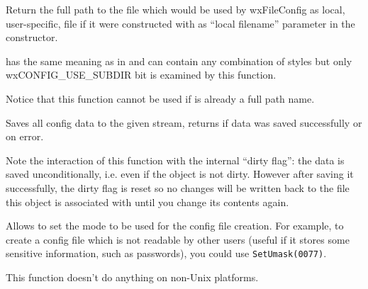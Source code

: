 \label{wxfilenamegetlocalfile}


Return the full path to the file which would be used by wxFileConfig as local,
user-specific, file if it were constructed with  as ``local
filename'' parameter in the constructor.

 has the same meaning as in  
and can contain any combination of styles but only wxCONFIG\_USE\_SUBDIR bit is
examined by this function.

Notice that this function cannot be used if  is already a full
path name.


\label{wxfileconfigsave}


Saves all config data to the given stream, returns \true if data was saved
successfully or \false on error.

Note the interaction of this function with the internal ``dirty flag'': the
data is saved unconditionally, i.e. even if the object is not dirty. However
after saving it successfully, the dirty flag is reset so no changes will be
written back to the file this object is associated with until you change its
contents again.




\label{wxfileconfigsetumask}


Allows to set the mode to be used for the config file creation. For example, to
create a config file which is not readable by other users (useful if it stores
some sensitive information, such as passwords), you could use 
{\tt SetUmask(0077)}.

This function doesn't do anything on non-Unix platforms.





